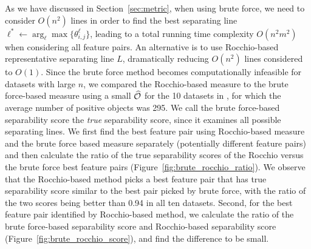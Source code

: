  As we have discussed in Section~\ref{sec:metric}, when using brute force, we need to consider $O(n^2)$ lines in order to find the best separating line $\ell^* \leftarrow \arg_\ell \max \{\theta_{i,j}^{\ell}\}$, leading to a total running time complexity $O(n^2m^2)$ when considering all feature pairs. An alternative is to use Rocchio-based representative separating line $L$, dramatically reducing $O(n^2)$ lines considered to $O(1)$. Since the brute force method becomes computationally infeasible for datasets with large $n$, we compared the Rocchio-based measure to the brute force-based measure using
a small $\widehat{{\mathcal{O}}}$ for
the 10 datasets in \msig, for which the average number of positive  objects was 295.
  
We call the brute force-based separability score the {\em true} separability score, since it examines all possible separating lines. We first find the best feature pair using Rocchio-based measure and the brute force based measure separately (potentially different feature pairs) and then calculate the ratio of the true separability scores of the Rocchio versus the brute force best feature pairs (Figure~\ref{fig:brute_rocchio_ratio}). We observe that the Rocchio-based method picks a best feature pair that has true separability score similar to the best pair picked by brute force, with the ratio of the two scores being better than 0.94 in all ten datasets. Second, for the best feature pair identified by Rocchio-based method, we calculate the ratio of the brute force-based separability score and Rocchio-based separability score (Figure~\ref{fig:brute_rocchio_score}), and find the difference to be small.

